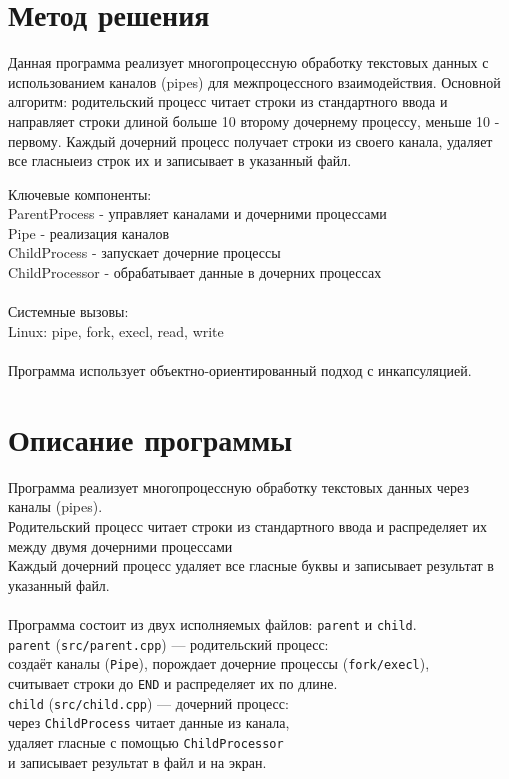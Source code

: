 \section{Метод решения}
Данная программа реализует многопроцессную обработку текстовых данных с использованием каналов (pipes) для межпроцессного взаимодействия.
Основной алгоритм: родительский процесс читает строки из стандартного ввода и направляет строки длиной больше 10 второму дочернему процессу, меньше 10 - первому. Каждый дочерний процесс получает строки из своего канала, удаляет все гласныеиз строк их и записывает в указанный файл.

Ключевые компоненты:\\
ParentProcess - управляет каналами и дочерними процессами\\
Pipe - реализация каналов\\
ChildProcess - запускает дочерние процессы\\
ChildProcessor - обрабатывает данные в дочерних процессах\\
\\
Системные вызовы:\\
Linux: pipe, fork, execl, read, write\\
\\
Программа использует объектно-ориентированный подход с инкапсуляцией.

\section{Описание программы}
Программа реализует многопроцессную обработку текстовых данных через каналы (pipes). \\
Родительский процесс читает строки из стандартного ввода и распределяет их между двумя дочерними процессами \\
Каждый дочерний процесс удаляет все гласные буквы и записывает результат в указанный файл.\\
\\
Программа состоит из двух исполняемых файлов: \texttt{parent} и \texttt{child}. \\
\texttt{parent} (\texttt{src/parent.cpp}) — родительский процесс: \\
создаёт каналы (\texttt{Pipe}), порождает дочерние процессы (\texttt{fork/execl}), \\
считывает строки до \texttt{END} и распределяет их по длине. \\
\texttt{child} (\texttt{src/child.cpp}) — дочерний процесс: \\
через \texttt{ChildProcess} читает данные из канала, \\
удаляет гласные с помощью \texttt{ChildProcessor} \\
и записывает результат в файл и на экран.\